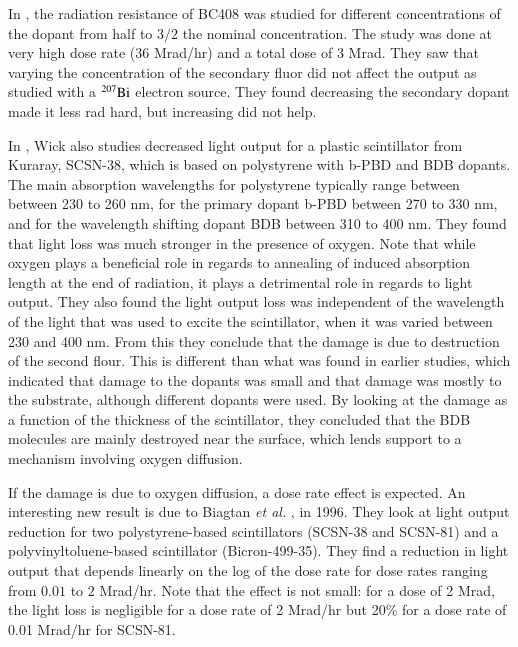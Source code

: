 In \cite{Majewski1989500}, the radiation resistance of BC408 was studied for different concentrations of the dopant from half to $3/2$ the nominal concentration.  The study was done at very high dose rate (36 Mrad/hr) and a total dose of 3 Mrad.  They saw that varying the concentration of the secondary fluor did not affect the output as studied with a $\rm{^{207}Bi}$ electron source.  They found decreasing the secondary dopant made it less rad hard, but increasing did not help.  


In \cite{Wick1991472}, Wick also studies decreased light
output for a plastic scintillator from Kuraray, SCSN-38, which
is based on polystyrene with b-PBD and BDB dopants.
The main absorption wavelengths for polystyrene typically range between
between 230 to 260 nm, for the primary dopant b-PBD between 270 to 330 nm,
and for the wavelength shifting dopant BDB between 310 to 400 nm.
They found that light loss was much stronger in the presence of oxygen.
Note that while oxygen plays a beneficial role in regards
to annealing of induced absorption length at the end of radiation, 
it plays a detrimental role in 
regards to light output.  
They also found the light output loss
was independent of the wavelength of the light
that was used to excite the scintillator, when it
was varied between 230 and 400 nm.
From this they conclude that the damage is due to destruction
of the second flour.  This is different than what was found in
earlier studies, which indicated that damage to the dopants was
small and that damage was mostly to the substrate,
although different dopants were used.
By looking at the damage as a function of the thickness of the scintillator,
they concluded that the BDB molecules are mainly destroyed
near the surface, which lends support to a mechanism involving
oxygen diffusion.

If the damage is due to oxygen diffusion, a dose rate effect
is expected.
An interesting new result is due to Biagtan {\it{et al.}} \cite{Biagtan1996125}, in 1996.  They look at light output reduction for two
polystyrene-based scintillators (SCSN-38 and SCSN-81) and a
polyvinyltoluene-based scintillator (Bicron-499-35).  
They find a reduction in light output that depends linearly on the
log of the dose rate for dose rates ranging from $0.01$ to
$2$ Mrad/hr.  Note that the effect is not small: for a
dose of 2 Mrad, the light loss is negligible for a dose rate
of 2 Mrad/hr but 20\% for a dose rate of 0.01 Mrad/hr for SCSN-81.

